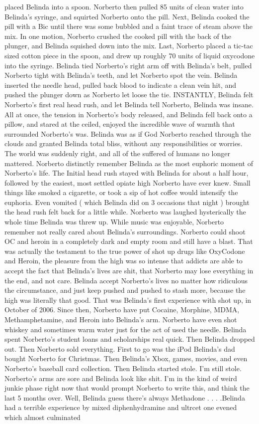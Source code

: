 \documentclass[12pt]{book}
\begin{document}
placed Belinda into a spoon. Norberto then pulled 85 units of clean water into Belinda's syringe, and squirted Norberto onto the pill. Next, Belinda cooked the pill with a Bic until there was some bubbled and a faint trace of steam above the mix. In one motion, Norberto crushed the cooked pill with the back of the plunger, and Belinda squished down into the mix. Last, Norberto placed a tic-tac sized cotton piece in the spoon, and drew up roughly 70 units of liquid oxycodone into the syringe. Belinda tied Norberto's right arm off with Belinda's belt, pulled Norberto tight with Belinda's teeth, and let Norberto spot the vein. Belinda inserted the needle head, pulled back blood to indicate a clean vein hit, and pushed the plunger down as Norberto let loose the tie. INSTANTLY, Belinda felt Norberto's first real head rush, and let Belinda tell Norberto, Belinda was insane. All at once, the tension in Norberto's body released, and Belinda fell back onto a pillow, and stared at the ceiled, enjoyed the incredible wave of warmth that surrounded Norberto's was. Belinda was as if God Norberto reached through the clouds and granted Belinda total bliss, without any responsibilities or worries. The world was suddenly right, and all of the suffered of humans no longer mattered. Norberto distinctly remember Belinda as the most euphoric moment of Norberto's life. The Initial head rush stayed with Belinda for about a half hour, followed by the easiest, most settled opiate high Norberto have ever knew. Small things like smoked a cigarette, or took a sip of hot coffee would intensify the euphoria. Even vomited ( which Belinda did on 3 occasions that night ) brought the head rush felt back for a little while. Norberto was laughed hysterically the whole time Belinda was threw up. While music was enjoyable, Norberto remember not really cared about Belinda's surroundings. Norberto could shoot OC and heroin in a completely dark and empty room and still have a blast. That was actually the testament to the true power of shot up drugs like OxyCodone and Heroin, the pleasure from the high was so intense that addicts are able to accept the fact that Belinda's lives are shit, that Norberto may lose everything in the end, and not care. Belinda accept Norberto's lives no matter how ridiculous the circumstance, and just keep pushed and pushed to stash more, because the high was literally that good. That was Belinda's first experience with shot up, in October of 2006. Since then, Norberto have put Cocaine, Morphine, MDMA, Methamphetamine, and Heroin into Belinda's arm. Norberto have even shot whiskey and sometimes warm water just for the act of used the needle. Belinda spent Norberto's student loans and scholarships real quick. Then Belinda dropped out. Then Norberto sold everything. First to go was the iPod Belinda's dad bought Norberto for Christmas. Then Belinda's Xbox, games, movies, and even Norberto's baseball card collection. Then Belinda started stole. I'm still stole. Norberto's arms are sore and Belinda look like shit. I'm in the kind of weird junkie phase right now that would prompt Norberto to write this, and think the last 5 months over. Well, Belinda guess there's always Methadone . . .  .Belinda had a terrible experience by mixed diphenhydramine and ultrcet one evened which almost culminated 
\end{document}
